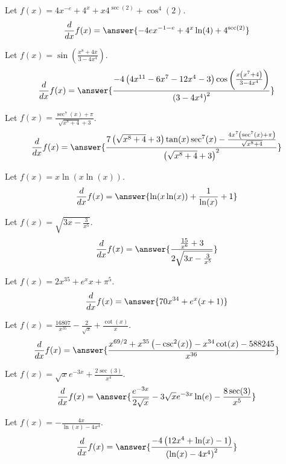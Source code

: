 \documentclass{ximera}
\begin{document}
\begin{shuffle}
\begin{exercise}
Let $f(x)=4 x^{-e}+4^x+x 4^{\sec (2)}+\cos ^4(2)$.
\[
\ddx f(x) = \answer{-4 e x^{-1-e}+4^x \ln (4)+4^{\sec (2)}}
\]
\end{exercise}

\begin{exercise}
Let $f(x)=\sin \left(\frac{x^8+4 x}{3-4 x^4}\right)$.
\[
\ddx f(x) = \answer{\frac{-4 \left(4 x^{11}-6 x^7-12 x^4-3\right) \cos \left(\frac{x \left(x^7+4\right)}{3-4 x^4}\right)}{\left(3-4 x^4\right)^2}}
\]
\end{exercise}

\begin{exercise}
Let $f(x)=\frac{\sec ^7(x)+\pi }{\sqrt{x^8+4}+3}$.
\[
\ddx f(x) = \answer{\frac{7 \left(\sqrt{x^8+4}+3\right) \tan (x) \sec ^7(x)-\frac{4 x^7 \left(\sec ^7(x)+\pi \right)}{\sqrt{x^8+4}}}{\left(\sqrt{x^8+4}+3\right)^2}}
\]
\end{exercise}

\begin{exercise}
Let $f(x)=x \ln (x \ln (x))$.
\[
\ddx f(x) = \answer{\ln (x \ln (x))+\frac{1}{\ln (x)}+1}
\]
\end{exercise}

\begin{exercise}
Let $f(x)=\sqrt{3 x-\frac{3}{x^5}}$.
\[
\ddx f(x) = \answer{\frac{\frac{15}{x^6}+3}{2 \sqrt{3 x-\frac{3}{x^5}}}}
\]
\end{exercise}

\begin{exercise}
Let $f(x)=2 x^{35}+e^x x+\pi ^5$.
\[
\ddx f(x) = \answer{70 x^{34}+e^x (x+1)}
\]
\end{exercise}

\begin{exercise}
Let $f(x)=\frac{16807}{x^{35}}-\frac{2}{\sqrt{x}}+\frac{\cot (x)}{x}$.
\[
\ddx f(x) = \answer{\frac{x^{69/2}+x^{35} \left(-\csc ^2(x)\right)-x^{34} \cot (x)-588245}{x^{36}}}
\]
\end{exercise}

\begin{exercise}
Let $f(x)=\sqrt{x} e^{-3 x}+\frac{2 \sec (3)}{x^4}$.
\[
\ddx f(x) = \answer{\frac{e^{-3 x}}{2 \sqrt{x}}-3 \sqrt{x} e^{-3 x} \ln (e)-\frac{8 \sec (3)}{x^5}}
\]
\end{exercise}

\begin{exercise}
Let $f(x)=-\frac{4 x}{\ln (x)-4 x^4}$.
\[
\ddx f(x) = \answer{\frac{-4 \left(12 x^4+\ln (x)-1\right)}{\left(\ln (x)-4 x^4\right)^2}}
\]
\end{exercise}


\end{shuffle}
\end{document}
